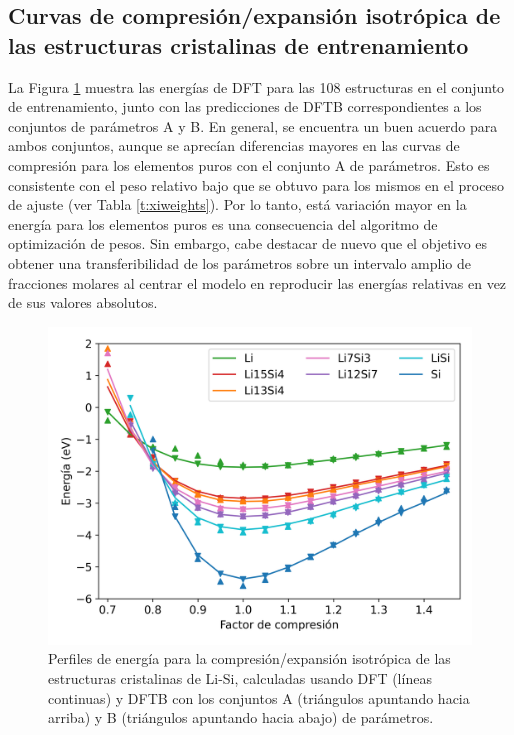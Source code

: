 \subsection{Curvas de compresión/expansión isotrópica de las estructuras 
cristalinas de entrenamiento}

La Figura \ref{fig:compresion} muestra las energías de DFT para las 108 
estructuras en el conjunto de entrenamiento, junto con las predicciones de
DFTB correspondientes a los conjuntos de parámetros A y B. En general, se 
encuentra un buen acuerdo para ambos conjuntos, aunque se aprecían diferencias
mayores en las curvas de compresión para los elementos puros con el conjunto 
A de parámetros. Esto es consistente con el peso relativo bajo que se obtuvo
para los mismos en el proceso de ajuste (ver Tabla \ref{t:xiweights}). Por lo 
tanto, está variación mayor en la energía para los elementos puros es una 
consecuencia del algoritmo de optimización de pesos. Sin embargo, cabe 
destacar de nuevo que el objetivo es obtener una transferibilidad de los 
parámetros sobre un intervalo amplio de fracciones molares al centrar el 
modelo en reproducir las energías relativas en vez de sus valores absolutos.
\begin{figure}[h!]
    \centering
    \includegraphics[width=.7\textwidth]{Silicio/modelo/resultados/compresion/compresion.png}
    \caption{Perfiles de energía para la compresión/expansión isotrópica de las 
    estructuras cristalinas de Li-Si, calculadas usando DFT (líneas continuas) 
    y DFTB con los conjuntos A (triángulos apuntando hacia arriba) y B 
    (triángulos apuntando hacia abajo) de parámetros.}
    \label{fig:compresion}
\end{figure}
